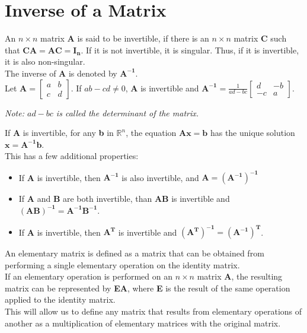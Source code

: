 \documentclass[nobib]{tufte-handout}
\begin{document}
\section{Inverse of a Matrix}
An $n\times n$ matrix \textbf{A} is said to be invertible, if there is an
$n\times n$ matrix \textbf{C} such that $\mathbf{CA=AC=I_n}$. If it is not
invertible, it is singular. Thus, if it is invertible, it is also
non-singular.\\ The inverse of $\mathbf{A}$ is denoted by $\mathbf{A^{-1}}$.\\
Let $\mathbf{A} = \begin{bmatrix}
        a & b \\
        c & d
    \end{bmatrix}$. If $ab-cd \neq 0$, \textbf{A} is invertible and $\mathbf{A^{-1}} = \frac{1}{ad-bc}\begin{bmatrix}
    d  & -b \\
    -c & a
\end{bmatrix}$.\\
\begin{center}
    \textit{Note: $ad-bc$ is called the determinant of the matrix.}\\    
\end{center}
If \textbf{A} is invertible, for any \textbf{b} in $\mathbb{R}^n$, the equation $\mathbf{Ax=b}$ has the unique solution $\mathbf{x=A^{-1}b}$.\\
This has a few additional properties:
\begin{itemize}
    \item If \textbf{A} is invertible, then $\mathbf{A^{-1}}$ is also invertible, and $\mathbf{A = (A^{-1})^{-1}}$
    \item If \textbf{A} and \textbf{B} are both invertible, than \textbf{AB} is invertible and $\mathbf{(AB)^{-1} = A^{-1}B^{-1}}$.
    \item If \textbf{A} is invertible, then $\mathbf{A^T}$ is invertible and $\mathbf{(A^T)^{-1} = (A^{-1})^T}$.
\end{itemize}
An elementary matrix is defined as a matrix that can be obtained from performing a single elementary operation on the identity matrix.\\
If an elementary operation is performed on an $n\times n$ matrix \textbf{A}, the resulting matrix can be represented by \textbf{EA}, where \textbf{E} is the result of the same operation applied to the identity matrix.\\
This will allow us to define any matrix that results from elementary operations of another as a multiplication of elementary matrices with the original matrix.\\
\end{document}
